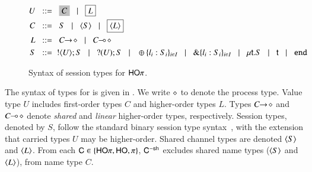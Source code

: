 \documentclass[preprint,11pt]{elsarticle}
\begin{document}
{%
\begin{figure}[t!]
	\begin{align*}
		U & \bnfis 	\nonhosyntax{C} \bnfbar \nonpisyntax{L}
		\\
		C  & \bnfis		S \bnfbar \chtype{S} \bnfbar \nonpisyntax{\chtype{L}}
\\		
L & \bnfis		\shot{C} \bnfbar \lhot{C}
		\\ 
		S & \bnfis 	\btout{U} S \bnfbar \btinp{U} S \bnfbar \btsel{l_i:S_i}_{i \in I}
						\bnfbar \btbra{l_i:S_i}_{i \in I} \bnfbar  \trec{t}{S} \bnfbar \vart{t}  \bnfbar \tinact
	\end{align*}
	\caption{Syntax of session types for $\mathsf{HO}\pi$.\label{f:types}}
\end{figure}

The syntax of types for \HOp is given in . We write $\diamond$ to denote the process type.
Value type $U$ includes
  first-order types $C$ and  higher-order
types $L$.
Types $C\!\! \rightarrow\! \diamond$ and $C\!\! \multimap\! \diamond$ denote
{\em shared} and {\em linear} higher-order 
types, respectively.
Session types, denoted by $S$, follow the standard binary session type syntax~\cite{honda.vasconcelos.kubo:language-primitives}, with
the extension that carried types $U$ may be higher-order.
Shared channel types are denoted $\langle S \rangle$ and $\langle L \rangle$.
From each $\mathsf{C} \in \{\mathsf{HO}\pi, \mathsf{HO}, \pi \}$, $\mathsf{C}^{-\mathsf{sh}}$ 
excludes shared name types ($\langle S \rangle$ and $\langle L \rangle$), 
from name type $C$.

}
\end{document}
